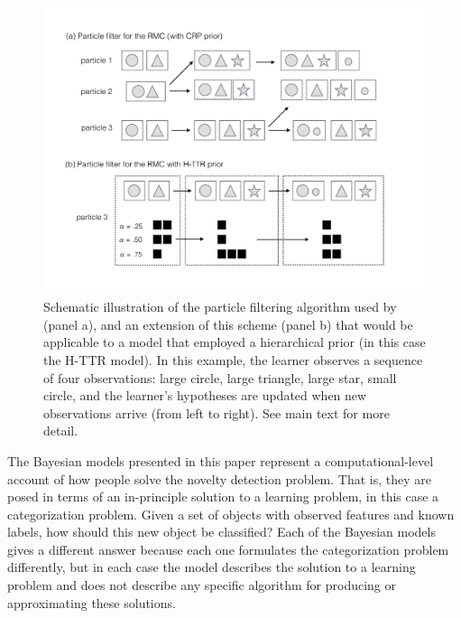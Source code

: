 \documentclass[doc]{apa6}
\begin{document}
\begin{figure}[t]
\begin{center}
\includegraphics[scale=.4]{particles.pdf}
\caption{Schematic illustration of the particle filtering algorithm used by \protect{} (panel a), and an extension of this scheme (panel b) that would be applicable to a model that employed a hierarchical prior (in this case the H-TTR model). In this example, the learner observes a sequence of four observations: large circle, large triangle, large star, small circle, and the learner's hypotheses are updated when new observations arrive (from left to right). See main text for more detail.}
\label{particles}
\end{center}
\end{figure}


The Bayesian models presented in this paper represent a computational-level account of how people solve the novelty detection problem. That is, they are posed in terms of an in-principle solution to a learning problem, in this case a categorization problem. Given a set of objects with observed features and known labels, how should this new object be classified? Each of the Bayesian models gives a different answer because each one formulates the categorization problem differently, but in each case the model describes the solution to a learning problem and does not describe any specific algorithm for producing or approximating these solutions.
\end{document}
